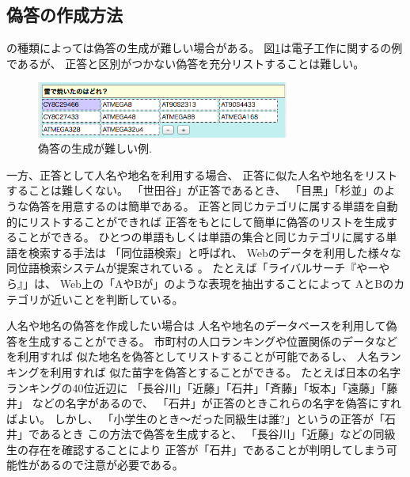 \documentclass[twoside]{wiss}
\begin{document}
% 
% 

\subsection{偽答の作成方法}

{\SQ}の種類によっては偽答の生成が難しい場合がある。
図\ref{atmega}は電子工作に関する{\SQ}の例であるが、
正答と区別がつかない偽答を充分リストすることは難しい。

\begin{figure}[H]
\centerline{\includegraphics[width=83mm,bb=0 0 512 113]{figures/2f63ceb9ab6faf8d81393953f2f95a8c.png}}
\caption{偽答の生成が難しい例.}
\label{atmega}
\end{figure}

一方、正答として人名や地名を利用する場合、
正答に似た人名や地名をリストすることは難しくない。
「世田谷」が正答であるとき、
「目黒」「杉並」のような偽答を用意するのは簡単である。
%
正答と同じカテゴリに属する単語を自動的にリストすることができれば
正答をもとにして簡単に偽答のリストを生成することができる。
%
ひとつの単語もしくは単語の集合と同じカテゴリに属する単語を検索する手法は
「同位語検索」と呼ばれ、
Webのデータを利用した様々な同位語検索システムが提案されている%
\cite{Huang:2012:LFC:2426725.2426728}%
\cite{BooWa}%
\cite{Wang:2007:LSE:1441428.1442086}%
\cite{大島裕明:2006-12-15}%
。
たとえば「ライバルサーチ『やーやら』」\cite{大島裕明:2006-12-15}は、
Web上の「AやBが」のような表現を抽出することによって
AとBのカテゴリが近いことを判断している。

人名や地名の偽答を作成したい場合は
人名や地名のデータベースを利用して偽答を生成することができる。
市町村の人口ランキングや位置関係のデータなどを利用すれば
似た地名を偽答としてリストすることが可能であるし、
人名ランキングを利用すれば
似た苗字を偽答とすることができる。
たとえば日本の名字ランキングの40位近辺に
「長谷川」「近藤」「石井」「斉藤」「坂本」「遠藤」「藤井」
などの名字があるので、
「石井」が正答のときこれらの名字を偽答にすればよい。
しかし、
「小学生のとき〜だった同級生は誰?」という{\SQ}の正答が「石井」であるとき
この方法で偽答を生成すると、
「長谷川」「近藤」などの同級生の存在を確認することにより
正答が「石井」であることが判明してしまう可能性があるので注意が必要である。
\end{document}
